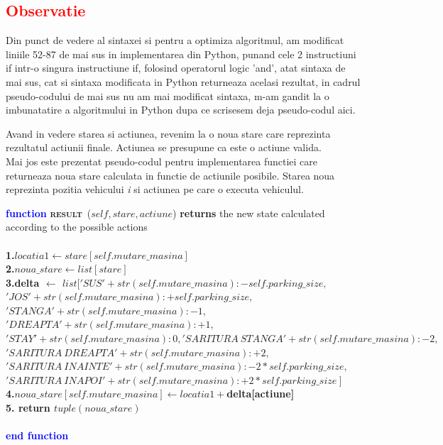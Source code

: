 \documentclass{article}
\begin{document}
\subsection*{\textcolor{red}{Observatie}}
\quad Din punct de vedere al sintaxei si pentru a optimiza algoritmul, am modificat liniile 52-87 de mai sus in implementarea din Python, punand cele 2 instructiuni if intr-o singura instructiune if, folosind operatorul logic 'and', atat sintaxa de mai sus, cat si sintaxa modificata in Python returneaza acelasi rezultat, in cadrul pseudo-codului de mai sus nu am mai modificat sintaxa, m-am gandit la o imbunatatire a algoritmului in Python dupa ce scrisesem deja  pseudo-codul aici. \par
\vspace{10mm}
\newpage
\quad Avand in vedere starea si actiunea, revenim la o noua stare care reprezinta rezultatul actiunii finale. Actiunea se presupune ca este o actiune valida. \\ 
Mai jos este prezentat pseudo-codul pentru implementarea functiei care returneaza noua stare calculata in functie de actiunile posibile. Starea noua reprezinta pozitia vehicului \emph{i} si actiunea pe care o executa vehiculul. \par
\vspace{10mm}
\begin{center}
\begin{tabbing}
\large
\indent\textbf{\textcolor{blue}{func}}\=\textbf{\textcolor{blue}{tion}}
\textsc{\bfseries result}\ {($self,stare, actiune$)}\textbf{ returns} the new state calculated according to the possible actions\\\\
\bfseries{1.}\indent\>$locatia1 \leftarrow stare[self.mutare\_masina]$\\
\bfseries{2.}\indent\>$noua\_stare \leftarrow list[stare]$\\
\bfseries{3.}\indent\>\textbf{delta} $\leftarrow$ $list[ 'SUS' + str( self.mutare\_masina ):-self.parking\_size ,$\\\indent\> $ 'JOS' + str( self.mutare\_masina ):+self.parking\_size , $\\\indent\> $ 'STANGA' + str( self.mutare\_masina ):-1 ,$\\\indent\> $ 'DREAPTA' + str( self.mutare\_masina ):+1 , $ \\ \indent \> $ 'STAY' + str( self.mutare\_masina ): 0, 'SARITURA\ STANGA' + str( self.mutare\_masina ): -2,$\\\indent\> $'SARITURA\ DREAPTA' + str( self.mutare\_masina ): +2,$\\\indent\>$'SARITURA\ INAINTE' + str( self.mutare\_masina ): -2*self.parking\_size,$\\\indent\>$'SARITURA\ INAPOI' + str( self.mutare\_masina ): +2*self.parking\_size \ ] $\\
\bfseries{4.}\indent \>$noua\_stare[self.mutare\_masina] \leftarrow locatia1 + $\textbf{delta}[actiune]\\
\bfseries{5.}\indent \> \textbf{return }$tuple(noua\_stare)$\\\\
\indent\textbf{\textcolor{blue}{end }}\=\textbf{\textcolor{blue}{function}}
\end{tabbing}
\end{center}
\end{document}
